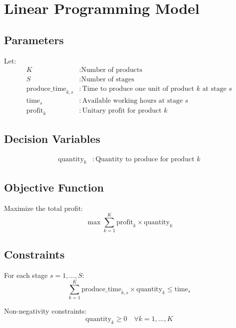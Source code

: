 \documentclass{article}
\begin{document}
\section*{Linear Programming Model}

\subsection*{Parameters}

Let:
\begin{align*}
    K & : \text{Number of products} \\
    S & : \text{Number of stages} \\
    \text{produce\_time}_{k, s} & : \text{Time to produce one unit of product } k \text{ at stage } s  \\
    \text{time}_{s} & : \text{Available working hours at stage } s \\
    \text{profit}_{k} & : \text{Unitary profit for product } k
\end{align*}

\subsection*{Decision Variables}

\begin{align*}
    \text{quantity}_{k} & : \text{Quantity to produce for product } k
\end{align*}

\subsection*{Objective Function}

Maximize the total profit:
\[
\max \sum_{k=1}^{K} \text{profit}_{k} \times \text{quantity}_{k}
\]

\subsection*{Constraints}

For each stage $s = 1, \ldots, S$:
\[
\sum_{k=1}^{K} \text{produce\_time}_{k, s} \times \text{quantity}_{k} \leq \text{time}_{s}
\]

Non-negativity constraints:
\[
\text{quantity}_{k} \geq 0 \quad \forall k = 1, \ldots, K
\]
\end{document}
